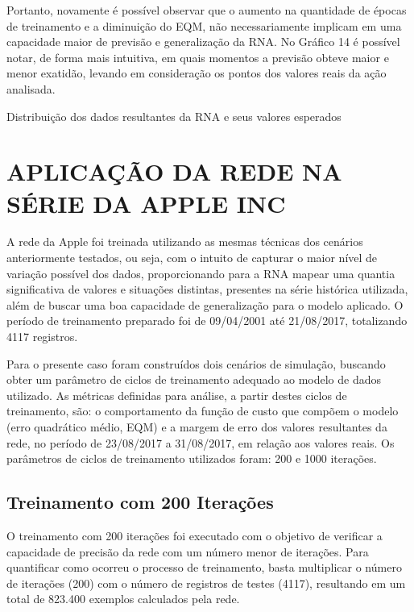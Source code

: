 Portanto, novamente é possível observar que o aumento na quantidade de épocas de treinamento e a diminuição do EQM, não necessariamente implicam em uma capacidade maior de previsão e generalização da RNA. No Gráfico 14 é possível notar, de forma mais intuitiva, em quais momentos a previsão obteve maior e menor exatidão, levando em consideração os pontos dos valores reais da ação analisada.

\begin{grafico}[h]
	\centering
	\caption{Distribuição dos dados resultantes da RNA e seus valores esperados}
	\label{lingua}
\end{grafico}

\section{APLICAÇÃO DA REDE NA SÉRIE DA APPLE INC}
A rede da Apple foi treinada utilizando as mesmas técnicas dos cenários anteriormente testados, ou seja, com o intuito de capturar o maior nível de variação possível dos dados, proporcionando para a RNA mapear uma quantia significativa de valores e situações distintas, presentes na série histórica utilizada, além de buscar uma boa capacidade de generalização para o modelo aplicado. O período de treinamento preparado foi de 09/04/2001 até 21/08/2017, totalizando 4117 registros.

Para o presente caso foram construídos dois cenários de simulação, buscando obter um parâmetro de ciclos de treinamento adequado ao modelo de dados utilizado. As métricas definidas para análise, a partir destes ciclos de treinamento, são: o comportamento da função de custo que compõem o modelo (erro quadrático médio, EQM) e a margem de erro dos valores resultantes da rede, no período de 23/08/2017 a 31/08/2017, em relação aos valores reais. Os parâmetros de ciclos de treinamento utilizados foram: 200 e 1000 iterações.

\subsection{Treinamento com 200 Iterações}	
O treinamento com 200 iterações foi executado com o objetivo de verificar a capacidade de precisão da rede com um número menor de iterações. Para quantificar como ocorreu o processo de treinamento, basta multiplicar o número de iterações (200) com o número de registros de testes (4117), resultando em um total de 823.400 exemplos calculados pela rede.

